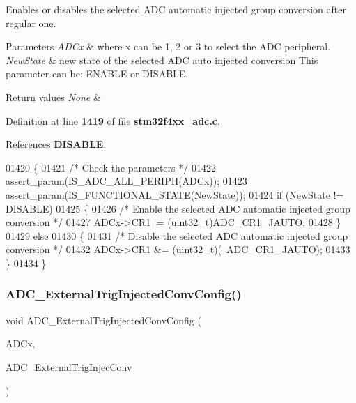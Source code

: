 Enables or disables the selected A\+DC automatic injected group conversion after regular one. 


\begin{DoxyParams}{Parameters}
{\em A\+D\+Cx} & where x can be 1, 2 or 3 to select the A\+DC peripheral. \\
\hline
{\em New\+State} & new state of the selected A\+DC auto injected conversion This parameter can be\+: E\+N\+A\+B\+LE or D\+I\+S\+A\+B\+LE. \\
\hline
\end{DoxyParams}

\begin{DoxyRetVals}{Return values}
{\em None} & \\
\hline
\end{DoxyRetVals}


Definition at line \textbf{ 1419} of file \textbf{ stm32f4xx\+\_\+adc.\+c}.



References \textbf{ D\+I\+S\+A\+B\+LE}.


\begin{DoxyCode}
01420 \{
01421   \textcolor{comment}{/* Check the parameters */}
01422   assert_param(IS_ADC_ALL_PERIPH(ADCx));
01423   assert_param(IS_FUNCTIONAL_STATE(NewState));
01424   \textcolor{keywordflow}{if} (NewState != DISABLE)
01425   \{
01426     \textcolor{comment}{/* Enable the selected ADC automatic injected group conversion */}
01427     ADCx->CR1 |= (uint32\_t)ADC_CR1_JAUTO;
01428   \}
01429   \textcolor{keywordflow}{else}
01430   \{
01431     \textcolor{comment}{/* Disable the selected ADC automatic injected group conversion */}
01432     ADCx->CR1 &= (uint32\_t)(~ADC_CR1_JAUTO);
01433   \}
01434 \}
\end{DoxyCode}
\mbox{\label{group__ADC__Group6_gafc02ce1e84e96b692adf085f61a0bca6}} 
\subsubsection{A\+D\+C\+\_\+\+External\+Trig\+Injected\+Conv\+Config()}
{\footnotesize\ttfamily void A\+D\+C\+\_\+\+External\+Trig\+Injected\+Conv\+Config (\begin{DoxyParamCaption}\item[{\textbf{ A\+D\+C\+\_\+\+Type\+Def} $\ast$}]{A\+D\+Cx,  }\item[{uint32\+\_\+t}]{A\+D\+C\+\_\+\+External\+Trig\+Injec\+Conv }\end{DoxyParamCaption})}



